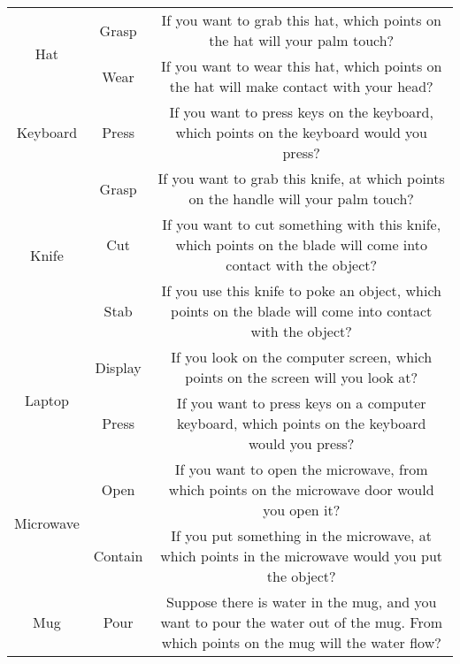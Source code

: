 \documentclass[final]{cvpr}
\begin{document}
\begin{table*}[t]
{\begin{tabular}{c|c|c}
    \multirow{2}{*}{Hat}              & Grasp               & If you want to grab this hat, which points on the hat will your palm touch?                                                                      \\
                                      & Wear                & If you want to wear this hat, which points on the hat will make contact with your head?                                                          \\ \hline
    Keyboard                          & Press               & If you want to press keys on the keyboard, which points on the keyboard would you press?                                                         \\ \hline
    \multirow{3}{*}{Knife}            & Grasp               & If you want to grab this knife, at which points on the handle will your palm touch?                                                              \\
                                      & Cut                 & If you want to cut something with this knife, which points on the blade will come into contact with the object?                                  \\
                                      & Stab                & If you use this knife to poke an object, which points on the blade will come into contact with the object?                                       \\ \hline
    \multirow{2}{*}{Laptop}           & Display             & If you look on the computer screen, which points on the screen will you look at?                                                                 \\
                                      & Press               & If you want to press keys on a computer keyboard, which points on the keyboard would you press?                                                  \\ \hline
    \multirow{2}{*}{Microwave}        & Open                & If you want to open the microwave, from which points on the microwave door would you open it?                                                    \\
                                      & Contain             & If you put something in the microwave, at which points in the microwave would you put the object?                                                \\ \hline
    \multirow{4}{*}{Mug}              & Pour                & Suppose there is water in the mug, and you want to pour the water out of the mug. From which points on the mug will the water flow?              \\

\end{tabular}}
\end{table*}
\end{document}
